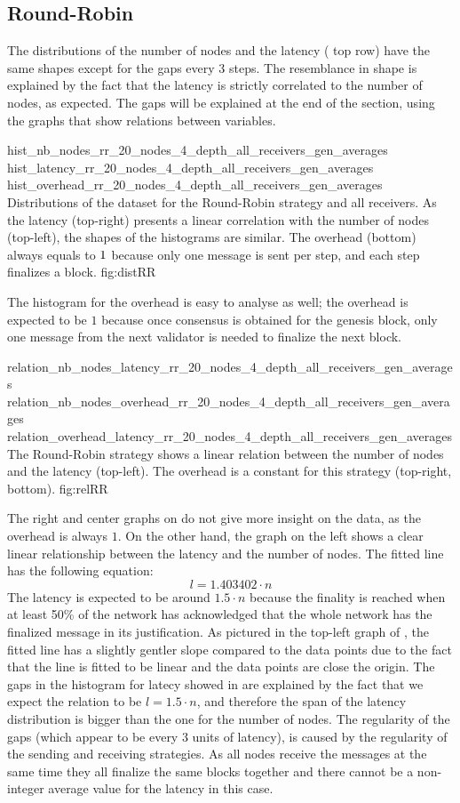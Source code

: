 \subsection{Round-Robin}
\FloatBarrier
The distributions of the number of nodes and the latency
( top row) have the same
shapes except for the gaps every 3 steps. The resemblance in shape is explained
by the fact that the latency is strictly correlated to the number of nodes, as
expected.
The gaps will be explained at the end of the section, using the graphs that show
relations between variables.

\triplefigure
    {hist_nb_nodes_rr_20_nodes_4_depth_all_receivers_gen_averages}
    {hist_latency_rr_20_nodes_4_depth_all_receivers_gen_averages}
    {hist_overhead_rr_20_nodes_4_depth_all_receivers_gen_averages}
    {Distributions of the dataset for the Round-Robin strategy and all
    receivers. As the latency (top-right) presents a linear correlation with the number of
    nodes (top-left), the shapes of the histograms are similar. The overhead
    (bottom) always equals to $\protect 1$ because only one message is sent per step, and each step
    finalizes a block.}
    {fig:distRR}

The histogram for the overhead is easy to analyse as well; the overhead is
expected to be $1$ because once consensus is obtained for the genesis block, only
one message from the next validator is needed to finalize the next block.

\triplefigure
    {relation_nb_nodes_latency_rr_20_nodes_4_depth_all_receivers_gen_averages}
    {relation_nb_nodes_overhead_rr_20_nodes_4_depth_all_receivers_gen_averages}
    {relation_overhead_latency_rr_20_nodes_4_depth_all_receivers_gen_averages}
    {The Round-Robin strategy shows a linear relation between the number of
    nodes and the latency (top-left). The overhead is a constant for this
    strategy (top-right, bottom).}
    {fig:relRR}

The right and center graphs on  do not give more insight on the
data, as the overhead is always \(1\). On the other hand, the graph on the left
shows a clear linear relationship between the latency and the number of nodes.
The fitted line has the following equation:
\[l = 1.403402\cdot n\]
The latency is expected to be around \(1.5\cdot n\) because the finality is
reached when at least 50\% of the network has acknowledged that the whole
network has the finalized message in its justification. As pictured in the
top-left graph of , the fitted line has a slightly gentler
slope compared to the data points due to the fact that the line is fitted to be
linear and the data points are close the origin. 
The gaps in the histogram for latecy showed in  are explained by the fact
that we expect the relation to be \(l = 1.5\cdot n\), and therefore the span of
the latency distribution is bigger than the one for the number of nodes. The
regularity of the gaps (which appear to be every 3 units of latency), is caused
by the regularity of the sending and receiving strategies. As all nodes receive
the messages at the same time they all finalize the same blocks together and
there cannot be a non-integer average value for the latency in this case.

